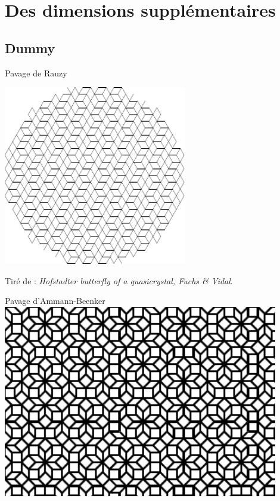 \documentclass[xcolor=x11names,compress,professionalfonts]{beamer}
\renewcommand{\(}{\begin{columns}}
\renewcommand{\)}{\end{columns}}
\newcommand{\<}[1]{\begin{column}{#1}}
\renewcommand{\>}{\end{column}}
\begin{document}
\section{Des dimensions supplémentaires}
\subsection{Dummy}

\begin{frame}{Pavage de Rauzy}
{\centering
\includegraphics[width=0.6\textwidth]{img/rauzy.pdf}

}

Tiré de : \emph{Hofstadter butterfly of a quasicrystal, Fuchs \& Vidal}.
\end{frame}

\begin{frame}{Pavage d'Ammann-Beenker}
\centering
\includegraphics[width=0.9\textwidth]{img/AB_tiling_patch.pdf}

\end{frame}
\end{document}

